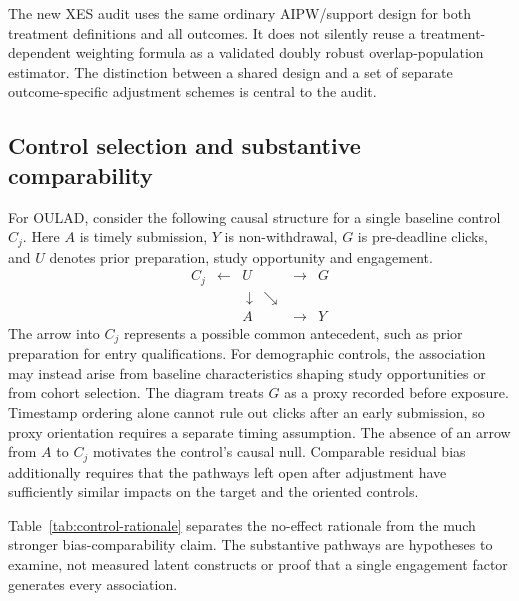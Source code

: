 The new XES audit uses the same ordinary AIPW/support design for both treatment definitions and all outcomes. It does not silently reuse a treatment-dependent weighting formula as a validated doubly robust overlap-population estimator. The distinction between a shared design and a set of separate outcome-specific adjustment schemes is central to the audit.

\subsection{Control selection and substantive comparability}

For OULAD, consider the following causal structure for a single baseline control $C_j$. Here $A$ is timely submission, $Y$ is non-withdrawal, $G$ is pre-deadline clicks, and $U$ denotes prior preparation, study opportunity and engagement.
\[
\begin{array}{ccccc}
C_j & \longleftarrow & U & \longrightarrow & G\\
 & & \downarrow\ \searrow & &\\[-2pt]
 & & A & \longrightarrow & Y
\end{array}
\]
The arrow into $C_j$ represents a possible common antecedent, such as prior preparation for entry qualifications. For demographic controls, the association may instead arise from baseline characteristics shaping study opportunities or from cohort selection. The diagram treats $G$ as a proxy recorded before exposure. Timestamp ordering alone cannot rule out clicks after an early submission, so proxy orientation requires a separate timing assumption. The absence of an arrow from $A$ to $C_j$ motivates the control's causal null. Comparable residual bias additionally requires that the pathways left open after adjustment have sufficiently similar impacts on the target and the oriented controls.

Table~\ref{tab:control-rationale} separates the no-effect rationale from the much stronger bias-comparability claim. The substantive pathways are hypotheses to examine, not measured latent constructs or proof that a single engagement factor generates every association.

